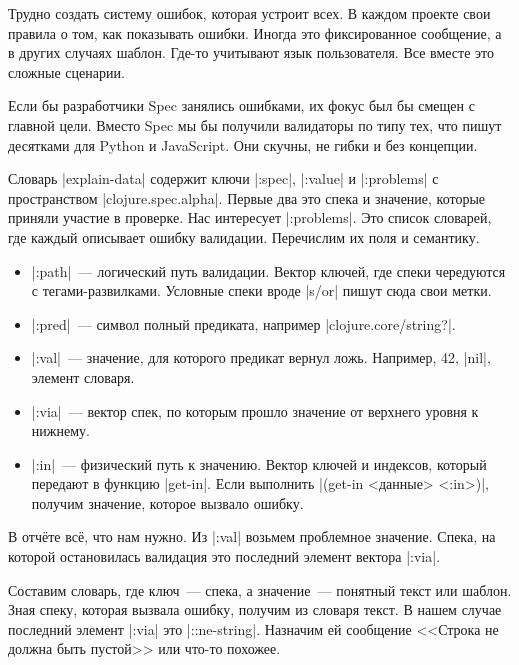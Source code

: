 
Трудно создать систему ошибок, которая устроит всех. В каждом проекте свои
правила о том, как показывать ошибки. Иногда это фиксированное сообщение, а в
других случаях шаблон. Где-то учитывают язык пользователя. Все вместе это
сложные сценарии.

Если бы разработчики Spec занялись ошибками, их фокус был бы смещен с главной
цели. Вместо Spec мы бы получили валидаторы по типу тех, что пишут десятками для
Python и JavaScript. Они скучны, не гибки и без концепции.

Словарь \spverb|explain-data| содержит ключи \spverb|:spec|, \spverb|:value| и
\spverb|:problems| с пространством \spverb|clojure.spec.alpha|. Первые два это
спека и значение, которые приняли участие в проверке. Нас интересует
\spverb|:problems|. Это список словарей, где каждый описывает ошибку
валидации. Перечислим их поля и семантику.


\begin{itemize}

\item
  \spverb|:path|~--- логический путь валидации. Вектор ключей, где спеки
  чередуются с тегами-развилками. Условные спеки вроде \spverb|s/or| пишут сюда
  свои метки.

\item
  \spverb|:pred|~--- символ полный предиката, например
  \spverb|clojure.core/string?|.

\item
  \spverb|:val|~--- значение, для которого предикат вернул ложь. Например, 42,
  \spverb|nil|, элемент словаря.

\item
  \spverb|:via|~--- вектор спек, по которым прошло значение от верхнего уровня к
  нижнему.

\item
  \spverb|:in|~--- физический путь к значению. Вектор ключей и индексов, который
  передают в функцию \spverb|get-in|. Если выполнить \spverb|(get-in <данные> <:in>)|,
  получим значение, которое вызвало ошибку.

\end{itemize}

В отч\"{е}те вс\"{е}, что нам нужно. Из \spverb|:val| возьмем проблемное
значение. Спека, на которой остановилась валидация это последний элемент вектора
\spverb|:via|.

Составим словарь, где ключ~--- спека, а значение~--- понятный текст или
шаблон. Зная спеку, которая вызвала ошибку, получим из словаря текст. В нашем
случае последний элемент \spverb|:via| это \spverb|::ne-string|. Назначим ей
сообщение <<Строка не должна быть пустой>> или что-то похожее.

